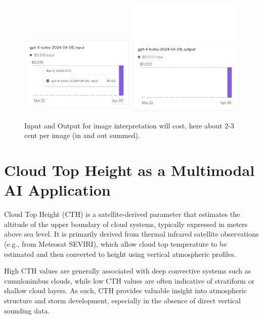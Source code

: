 \begin{figure}[ht]
  \centering
  \includegraphics[width=0.49\textwidth]{images/billing_gpt_4_turbo_in2.png}
  \includegraphics[width=0.49\textwidth]{images/billing_gpt_4_turbo_out2.png}
  \caption{Input and Output for image interpretation will cost, here about 2-3 cent per image (in and out summed).}
\end{figure}

%
\section{Cloud Top Height as a Multimodal AI Application}

Cloud Top Height (CTH) is a satellite-derived parameter that estimates the altitude of the upper boundary of cloud systems, typically expressed in meters above sea level. It is primarily derived from thermal infrared satellite observations (e.g., from Meteosat SEVIRI), which allow cloud top temperature to be estimated and then converted to height using vertical atmospheric profiles.

High CTH values are generally associated with deep convective systems such as cumulonimbus clouds, while low CTH values are often indicative of stratiform or shallow cloud layers. As such, CTH provides valuable insight into atmospheric structure and storm development, especially in the absence of direct vertical sounding data.


